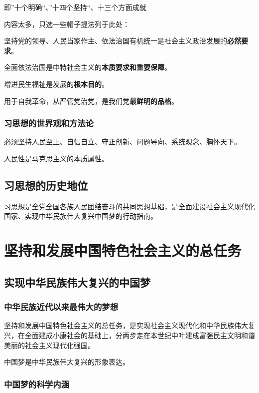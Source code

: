 \documentclass[12pt, a4paper, oneside]{ctexart}
\begin{document}
即”十个明确“、”十四个坚持“、十三个方面成就

内容太多，只选一些帽子提法列于此处：

坚持党的领导、人民当家作主、依法治国有机统一是社会主义政治发展的\textbf{必然要求}。

全面依法治国是中特社会主义的\textbf{本质要求和重要保障}。

增进民生福祉是发展的\textbf{根本目的}。

用于自我革命，从严管党治党，是我们党\textbf{最鲜明的品格}。

\subsubsection{习思想的世界观和方法论}

必须坚持人民至上、自信自立、守正创新、问题导向、系统观念、胸怀天下。

人民性是马克思主义的本质属性。

\subsection{习思想的历史地位}

习思想是全党全国各族人民团结奋斗的共同思想基础，是全面建设社会主义现代化国家、实现中华民族伟大复兴中国梦的行动指南。

\section{坚持和发展中国特色社会主义的总任务}

\subsection{实现中华民族伟大复兴的中国梦}

\subsubsection{中华民族近代以来最伟大的梦想}

坚持和发展中国特色社会主义的总任务，是实现社会主义现代化和中华民族伟大复兴，在全面建成小康社会的基础上，分两步走在本世纪中叶建成富强民主文明和谐美丽的社会主义现代化强国。

中国梦是中华民族伟大复兴的形象表达。

\subsubsection{中国梦的科学内涵}
\end{document}
